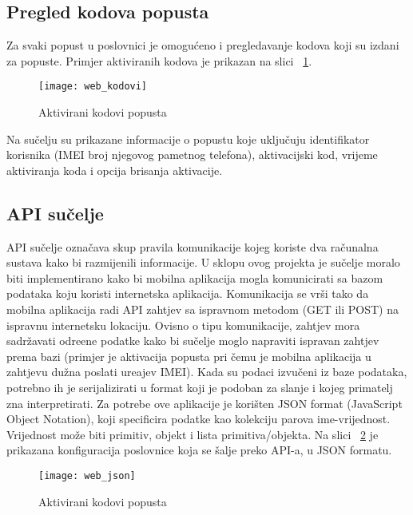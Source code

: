 \subsection{Pregled kodova popusta}
Za svaki popust u poslovnici je omogu\'{c}eno i pregledavanje kodova koji su izdani za popuste. Primjer aktiviranih kodova je prikazan na slici ~\ref{fig:web_kodovi}.

\begin{figure}[!htbp]
	\begin{center}
 \texttt{[image: web\_kodovi]}
 \caption{Aktivirani kodovi popusta}
 \label{fig:web_kodovi}
	\end{center}
\end{figure}

Na su\v{c}elju su prikazane informacije o popustu koje uklju\v{c}uju identifikator korisnika (IMEI broj njegovog pametnog telefona), aktivacijski kod, vrijeme aktiviranja koda i opcija brisanja aktivacije.

\subsection{API su\v{c}elje}

API su\v{c}elje ozna\v{c}ava skup pravila komunikacije kojeg koriste dva ra\v{c}unalna sustava kako bi razmijenili informacije. U sklopu ovog projekta je su\v{c}elje moralo biti implementirano kako bi mobilna aplikacija mogla komunicirati sa bazom podataka koju koristi internetska aplikacija. Komunikacija se vr\v{s}i tako da mobilna aplikacija radi API zahtjev sa ispravnom metodom (GET ili POST) na ispravnu internetsku lokaciju. Ovisno o tipu komunikacije, zahtjev mora sadr\v{z}avati odre\dj ene podatke kako bi su\v{c}elje moglo napraviti ispravan zahtjev prema bazi (primjer je aktivacija popusta pri \v{c}emu je mobilna aplikacija u zahtjevu du\v{z}na poslati ure\dj ajev IMEI). Kada su podaci izvu\v{c}eni iz baze podataka, potrebno ih je serijalizirati u format koji je podoban za slanje i kojeg primatelj zna interpretirati. Za potrebe ove aplikacije je kori\v{s}ten JSON format \cite{json} (JavaScript Object Notation), koji specificira podatke kao kolekciju parova ime-vrijednost. Vrijednost mo\v{z}e biti primitiv, objekt i lista primitiva/objekta. Na slici ~\ref{fig:web_json} je prikazana konfiguracija poslovnice koja se \v{s}alje preko API-a, u JSON formatu.


\begin{figure}[!htbp]
	\begin{center}
 \texttt{[image: web\_json]}
 \caption{Aktivirani kodovi popusta}
 \label{fig:web_json}
	\end{center}
\end{figure}

